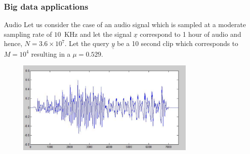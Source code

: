 \documentclass[10pt,xcolor=table]{beamer}
\newcommand{\xv}{\underline{x}}
\newcommand{\yv}{\underline{y}}
\begin{document}
\begin{frame}\frametitle{Big data applications}
\begin{block}{Audio}
Let us consider the case of an audio signal which is sampled at a moderate sampling rate of $10$~KHz and let the signal $\xv$ correspond to 1 hour of audio and hence, $N = 3.6 \times 10^7$. Let the query $\yv$ be a 10 second clip which corresponds to $M = 10^4$ resulting in a $\mu = 0.529$.
\end{block}
\begin{block}{}
\begin{figure}
\includegraphics[width=3.5in]{ScaledVoice.pdf}
\end{figure}
\end{block}
\end{frame}
\end{document}
